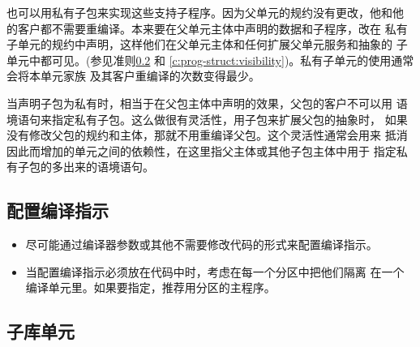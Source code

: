 \begin{blockindent}
也可以用私有子包来实现这些支持子程序。因为父单元的规约没有更改，他和他
的客户都不需要重编译。本来要在父单元主体中声明的数据和子程序，改在
私有子单元的规约中声明，这样他们在父单元主体和任何扩展父单元服务和抽象的
子单元中都可见。(参见准则\ref{c:prog-struct:high-level:child-lib-unit} 和
\ref{c:prog-struct:visibility})。私有子单元的使用通常会将本单元家族
及其客户重编译的次数变得最少。

当声明子包为私有时，相当于在父包主体中声明的效果，父包的客户不可以用
语境语句来指定私有子包。这么做很有灵活性，用子包来扩展父包的抽象时，
如果没有修改父包的规约和主体，那就不用重编译父包。这个灵活性通常会用来
抵消因此而增加的单元之间的依赖性，在这里指父主体或其他子包主体中用于
指定私有子包的多出来的语境语句。
\end{blockindent}

\subsection{配置编译指示}
\begin{itemize}
    \item 尽可能通过编译器参数或其他不需要修改代码的形式来配置编译指示。
    \item 当配置编译指示必须放在代码中时，考虑在每一个分区中把他们隔离
在一个编译单元里。如果要指定，推荐用分区的主程序。
\end{itemize}

\begin{blockindent}
\end{blockindent}


\subsection{子库单元}

\label{c:prog-struct:high-level:child-lib-unit}
